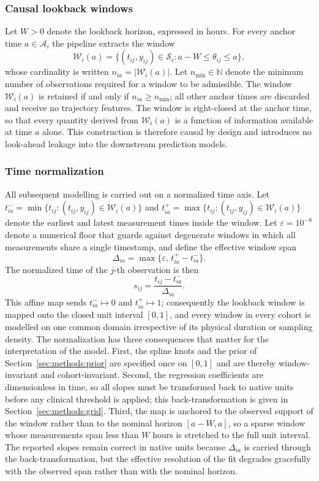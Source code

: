 \subsubsection{Causal lookback windows}

Let $W>0$ denote the lookback horizon, expressed in hours. For every anchor time $a\in\mathcal{A}_i$ the pipeline extracts the window
$$\mathcal{W}_i(a)=\{(t_{ij},y_{ij})\in\mathcal{S}_i:a-W\le\theta_{ij}\le a\},$$
whose cardinality is written $n_{ia}=|\mathcal{W}_i(a)|$. Let $n_{\min}\in\mathbb{N}$ denote the minimum number of observations required for a window to be admissible. The window $\mathcal{W}_i(a)$ is retained if and only if $n_{ia}\ge n_{\min}$; all other anchor times are discarded and receive no trajectory features. The window is right-closed at the anchor time, so that every quantity derived from $\mathcal{W}_i(a)$ is a function of information available at time $a$ alone. This construction is therefore causal by design and introduces no look-ahead leakage into the downstream prediction models.

\subsubsection{Time normalization}
\label{sec:methods:normalization}

All subsequent modelling is carried out on a normalized time axis. Let $t_{ia}^-=\min\{t_{ij}:(t_{ij},y_{ij})\in\mathcal{W}_i(a)\}$ and $t_{ia}^+=\max\{t_{ij}:(t_{ij},y_{ij})\in\mathcal{W}_i(a)\}$ denote the earliest and latest measurement times inside the window. Let $\varepsilon=10^{-8}$ denote a numerical floor that guards against degenerate windows in which all measurements share a single timestamp, and define the effective window span
$$\Delta_{ia}=\max\{\varepsilon,\,t_{ia}^+-t_{ia}^-\}.$$
The normalized time of the $j$-th observation is then
$$s_{ij}=\frac{t_{ij}-t_{ia}^-}{\Delta_{ia}}.$$
This affine map sends $t_{ia}^-\mapsto0$ and $t_{ia}^+\mapsto1$; consequently the lookback window is mapped onto the closed unit interval $[0,1]$, and every window in every cohort is modelled on one common domain irrespective of its physical duration or sampling density. The normalization has three consequences that matter for the interpretation of the model. First, the spline knots and the prior of Section~\ref{sec:methods:prior} are specified once on $[0,1]$ and are thereby window-invariant and cohort-invariant. Second, the regression coefficients are dimensionless in time, so all slopes must be transformed back to native units before any clinical threshold is applied; this back-transformation is given in Section~\ref{sec:methods:grid}. Third, the map is anchored to the observed support of the window rather than to the nominal horizon $[a-W,a]$, so a sparse window whose measurements span less than $W$ hours is stretched to the full unit interval. The reported slopes remain correct in native units because $\Delta_{ia}$ is carried through the back-transformation, but the effective resolution of the fit degrades gracefully with the observed span rather than with the nominal horizon.

